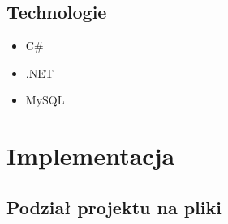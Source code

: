 \documentclass[12pt,a4paper]{article}
\begin{document}
			\subsection{Technologie}
			\begin{itemize}
			\item C\#
			\item .NET
			\item MySQL
			\end{itemize}
			\clearpage
	\section{Implementacja}
		\subsection{Podział projektu na pliki}
\end{document}

